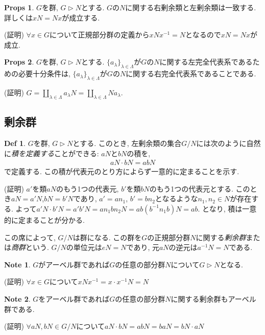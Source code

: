 \documentclass[dvipdfmx]{jsarticle}
\theoremstyle{definition}
\newtheorem{props}{Props}
\newtheorem{definition}{Def}
\newtheorem{note}{Note}
\numberwithin{equation}{section}
\numberwithin{props}{section}
\numberwithin{definition}{section}
\numberwithin{note}{section}
\begin{document}
\begin{props}
     $G$を群, $G\rhd N$とする. $G$の$N$に関する右剰余類と左剰余類は一致する.
     詳しくは$xN=Nx$が成立する.
\end{props}
(証明) $\forall x\in G$について正規部分群の定義から$xNx^{-1}=N$となるので$xN=Nx$が成立.

\begin{props}
     $G$を群, $G\rhd N$とする. $\lbrace a_\lambda\rbrace_{\lambda\in \Lambda}$が$G$の$N$に関する左完全代表系であるための必要十分条件は, $\lbrace a_\lambda\rbrace_{\lambda\in \Lambda}$が$G$の$N$に関する右完全代表系であることである.
\end{props}
(証明) $G=\coprod_{\lambda\in \Lambda}a_\lambda N=\coprod_{\lambda\in \Lambda}N a_\lambda$.
\subsection{剰余群}
\begin{definition}
     $G$を群, $G\rhd N$とする. このとき, 左剰余類の集合$G/N$には次のように自然に\emph{積を定義する}ことができる: $aN$と$bN$の積を,
     \begin{align}
          aN\cdot bN=abN
     \end{align}
     で定義する. この積が代表元のとり方によらず一意的に定まることを示す.

     (証明) $a'$を類$aN$のもう1つの代表元, $b'$を類$bN$のもう1つの代表元とする.
     このとき$aN=a'N$,$bN=b'N$であり, $a'=an_1$, $b'=bn_2$となるような$n_1,n_2\in N$が存在する.
     よって$a'N\cdot b'N=a'b'N=an_1bn_2N=ab(b^{-1}n_1b)N=ab$. となり, 積は一意的に定まることが分かる.

     この席によって, $G/N$は群になる. この群を$G$の正規部分群$N$に関する\emph{剰余群}または\emph{商群}という. $G/N$の単位元は$eN=N$であり, 元$aN$の逆元は$a^{-1}N=N$である.
\end{definition}
\begin{note}
     $G$がアーベル群であれば$G$の任意の部分群$N$について$G\rhd N$となる.
\end{note}
(証明) $\forall x \in G$について$xNx^{-1}=x\cdot x^{-1}N=N$
\begin{note}
     $G$をアーベル群であれば$G$の任意の部分群$N$に関する剰余群もアーベル群である.
\end{note}
(証明) $\forall aN,bN\in G/N$について$aN\cdot b N=ab N=baN=bN\cdot aN$
\end{document}
